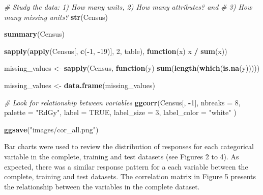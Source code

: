 \documentclass[]{book}
\newenvironment{Shaded}{\begin{snugshade}}{\end{snugshade}}
\newcommand{\KeywordTok}[1]{\textcolor[rgb]{0.13,0.29,0.53}{\textbf{#1}}}
\newcommand{\DataTypeTok}[1]{\textcolor[rgb]{0.13,0.29,0.53}{#1}}
\newcommand{\DecValTok}[1]{\textcolor[rgb]{0.00,0.00,0.81}{#1}}
\newcommand{\StringTok}[1]{\textcolor[rgb]{0.31,0.60,0.02}{#1}}
\newcommand{\CommentTok}[1]{\textcolor[rgb]{0.56,0.35,0.01}{\textit{#1}}}
\newcommand{\OtherTok}[1]{\textcolor[rgb]{0.56,0.35,0.01}{#1}}
\newcommand{\ControlFlowTok}[1]{\textcolor[rgb]{0.13,0.29,0.53}{\textbf{#1}}}
\newcommand{\OperatorTok}[1]{\textcolor[rgb]{0.81,0.36,0.00}{\textbf{#1}}}
\newcommand{\NormalTok}[1]{#1}
\begin{document}
\begin{Shaded}
\begin{Highlighting}[]
\CommentTok{# Study the data: 1) How many units, 2) How many attributes? and }
\CommentTok{# 3) How many missing units?}
\KeywordTok{str}\NormalTok{(Census)}

\KeywordTok{summary}\NormalTok{(Census)}

\KeywordTok{sapply}\NormalTok{(}\KeywordTok{apply}\NormalTok{(Census[, }\KeywordTok{c}\NormalTok{(}\OperatorTok{-}\DecValTok{1}\NormalTok{, }\OperatorTok{-}\DecValTok{19}\NormalTok{)], }\DecValTok{2}\NormalTok{, table), }\ControlFlowTok{function}\NormalTok{(x) x }\OperatorTok{/}\StringTok{ }\KeywordTok{sum}\NormalTok{(x))}

\NormalTok{missing_values <-}\StringTok{ }\KeywordTok{sapply}\NormalTok{(Census, }\ControlFlowTok{function}\NormalTok{(y) }\KeywordTok{sum}\NormalTok{(}\KeywordTok{length}\NormalTok{(}\KeywordTok{which}\NormalTok{(}\KeywordTok{is.na}\NormalTok{(y)))))}

\NormalTok{missing_values <-}\StringTok{ }\KeywordTok{data.frame}\NormalTok{(missing_values)}

\CommentTok{# Look for relationship between variables}
\KeywordTok{ggcorr}\NormalTok{(Census[, }\OperatorTok{-}\DecValTok{1}\NormalTok{],}
       \DataTypeTok{nbreaks =} \DecValTok{8}\NormalTok{, }\DataTypeTok{palette =} \StringTok{"RdGy"}\NormalTok{,}
       \DataTypeTok{label =} \OtherTok{TRUE}\NormalTok{, }\DataTypeTok{label_size =} \DecValTok{3}\NormalTok{, }\DataTypeTok{label_color =} \StringTok{"white"}
\NormalTok{)}

\KeywordTok{ggsave}\NormalTok{(}\StringTok{"images/cor_all.png"}\NormalTok{)}
\end{Highlighting}
\end{Shaded}

Bar charts were used to review the distribution of responses for each
categorical variable in the complete, training and test datasets (see
Figures 2 to 4). As expected, there was a similar response pattern for a
each variable between the complete, training and test datasets. The
correlation matrix in Figure 5 presents the relationship between the
variables in the complete dataset.
\end{document}
